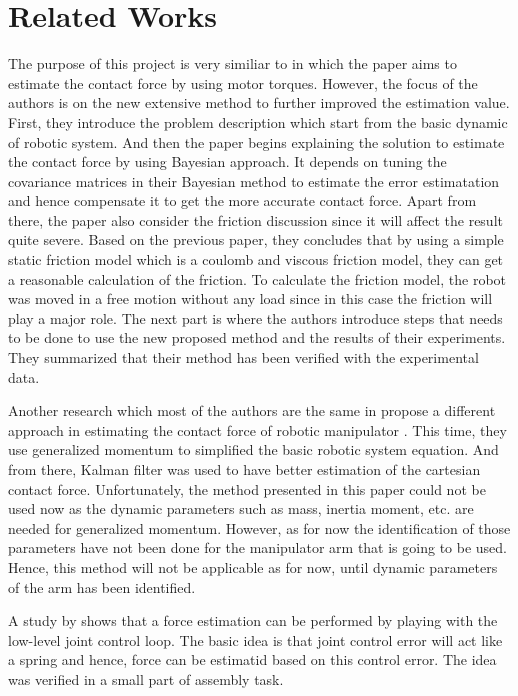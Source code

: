 \section{Related Works}

The purpose of this project is very similiar to \cite{Hao14} in which the paper aims to estimate the contact force by using motor torques. However, the focus of the authors is on the new extensive method to further improved the estimation value. First, they introduce the problem description which start from the basic dynamic of robotic system. And then the paper begins explaining the solution to estimate the contact force by using Bayesian approach. It depends on tuning the covariance matrices in their Bayesian method to estimate the error estimatation and hence compensate it to get the more accurate contact force. Apart from there, the paper also consider the friction discussion since it will affect the result quite severe. Based on the previous paper, they concludes that by using a simple static friction model which is a coulomb and viscous friction model, they can get a reasonable calculation of the friction. To calculate the friction model, the robot was moved in a free motion without any load since in this case the friction will play a major role. The next part is where the authors introduce steps that needs to be done to use the new proposed method and the results of their experiments. They summarized that their method has been verified with the experimental data.

Another research which most of the authors are the same in \cite{Hao14} propose a different approach in estimating the contact force of robotic manipulator \cite{Hao15}. This time, they use generalized momentum to simplified the basic robotic system equation. And from there, Kalman filter was used to have better estimation of the cartesian contact force. Unfortunately, the method presented in this paper could not be used now as the dynamic parameters such as mass, inertia moment, etc. are needed for generalized momentum. However, as for now the identification of those parameters have not been done for the manipulator arm that is going to be used. Hence, this method will not be applicable as for now, until dynamic parameters of the arm has been identified.


A study by \cite{Stolt12} shows that a force estimation can be performed by playing with the low-level joint control loop. The basic idea is that joint control error will act like a spring and hence, force can be estimatid based on this control error. The idea was verified in a small part of assembly task. 


